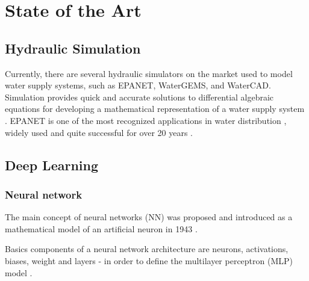 \chapter{State of the Art}%
\label{chapter:state-of-the-art}



\section{Hydraulic Simulation}

\begin{comment}
Atualmente no mercado existem diversos simuladores hidráulicos que são utilizados para modelar sistemas de abastecimento de água. Dentre eles, podemos citar o EPANET, WaterGEMS, WaterCAD, entre outros. A simulação permite oferecer soluções rápidas e precisas para equações algébricas diferenciais usadas para desenvolver a representação matemática de um sistema de abastecimento de água\cite{rfc1}. O EPANET é um dos mais reconhecidos aplicativos na área de distribuição de água\cite{rfc4}, amplamente utilizaddo e com muito sucesso\cite{rfc5} há mais de 20 anos\cite{rfc6} e é esta ferramenta a ser utilizada na simulação para obtenção dos dados necessários para a otimização.    
\end{comment}


Currently, there are several hydraulic simulators on the market used to model water supply systems, such as EPANET, WaterGEMS, and WaterCAD. Simulation provides quick and accurate solutions to differential algebraic equations for developing a mathematical representation of a water supply system \cite{rfc1}. EPANET is one of the most recognized applications in water distribution \cite{rfc4}, widely used and quite successful \cite{rfc5} for over 20 years \cite{rfc6}.


\section{Deep Learning}


\subsection{Neural network}

The main concept of neural networks (NN) was proposed and introduced as a mathematical model of an artificial neuron in 1943 \cite{rfc23}.

Basics components of a neural network architecture are neurons, activations, biases, weight and layers - in order to define the multilayer perceptron (MLP) model \cite{rfc23}.


